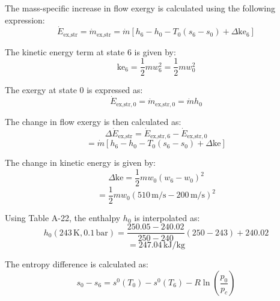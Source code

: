 The mass-specific increase in flow exergy is calculated using the following expression:  
\[
\dot{E}_{\text{ex,str}} = \dot{m}_{\text{ex,str}} = \dot{m} \left[ h_6 - h_0 - T_0 (s_6 - s_0) + \Delta \text{ke}_6 \right]
\]  

The kinetic energy term at state 6 is given by:  
\[
\text{ke}_6 = \frac{1}{2} m w_6^2 = \frac{1}{2} m w_0^2
\]  

The exergy at state 0 is expressed as:  
\[
\dot{E}_{\text{ex,str},0} = \dot{m}_{\text{ex,str},0} = \dot{m} h_0
\]  

The change in flow exergy is then calculated as:  
\[
\Delta \dot{E}_{\text{ex,str}} = \dot{E}_{\text{ex,str},6} - \dot{E}_{\text{ex,str},0}
\]  
\[
= \dot{m} \left[ h_6 - h_0 - T_0 (s_6 - s_0) + \Delta \text{ke} \right]
\]  

The change in kinetic energy is given by:  
\[
\Delta \text{ke} = \frac{1}{2} m w_0 \left( w_6 - w_0 \right)^2
\]  
\[
= \frac{1}{2} m w_0 \left( 510 \, \text{m/s} - 200 \, \text{m/s} \right)^2
\]  

Using Table A-22, the enthalpy \( h_0 \) is interpolated as:  
\[
h_0 (243 \, \text{K}, 0.1 \, \text{bar}) = \frac{250.05 - 240.02}{250 - 240} (250 - 243) + 240.02
\]  
\[
= 247.04 \, \text{kJ/kg}
\]  

The entropy difference is calculated as:  
\[
s_0 - s_6 = s^0(T_0) - s^0(T_6) - R \ln \left( \frac{p_0}{p_c} \right)
\]